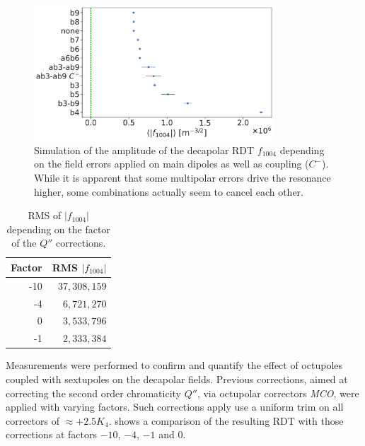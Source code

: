 \begin{figure}[!htb]
    \centering
    \includegraphics[width=0.8\textwidth]{./images/f1004/f1004_several_factors.pdf}
    \caption{Simulation of the amplitude of the decapolar RDT $f_{1004}$ depending on the field
             errors applied on main dipoles as well as coupling ($C^-$). While it is apparent that
             some multipolar errors drive the resonance higher, some combinations actually seem to
             cancel each other.}
    \label{fig:decapoles:rdts:contributions}
\end{figure}

\begin{table}
    \centering
    \begin{tabular}{rr}
    \toprule
    Factor & RMS $|f_{1004}|$ \\
    \midrule
       -10 & $37,308,159$         \\ 
        -4 &  $6,721,270$          \\ 
         0 &  $3,533,796$          \\ 
        -1 &  $2,333,384$          \\
    \bottomrule
    \end{tabular}
    \caption{RMS of $|f_{1004}|$ depending on the factor of the $Q''$ corrections.}
    \label{table:decapoles:corrections_dq2_f1004_rms}
\end{table}

Measurements were performed to confirm and quantify the effect of octupoles coupled with sextupoles
on the decapolar fields. Previous corrections, aimed at correcting the second order chromaticity
$Q''$, via octupolar correctors \textit{MCO}, were applied with varying factors. Such corrections
apply use a uniform trim on all correctors of $\approx +2.5K_4$.
 shows a comparison of the resulting RDT with those
corrections at factors $-10$, $-4$, $-1$ and $0$.

